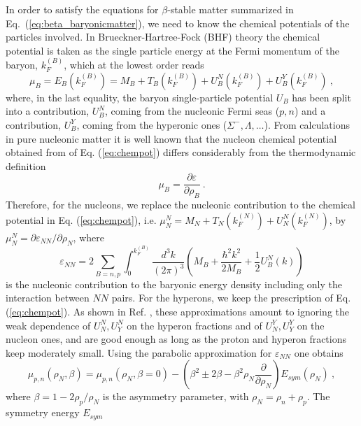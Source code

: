 In order to satisfy the equations 
for $\beta$-stable matter summarized in Eq.\ (\ref{eq:beta_baryonicmatter}), 
we need to know the chemical potentials of the particles involved.
In Brueckner-Hartree-Fock (BHF) theory the chemical potential is taken as
the
single particle energy at the Fermi momentum of the baryon, $k_F^{(B)}$,
which at the lowest order reads
\begin{equation}
\mu_B=E_B(k_F^{(B)})=M_B+T_B(k_F^{(B)})+U_B^N(k_F^{(B)})+
U_B^Y(k_F^{(B)}) \ ,
\label{eq:chempot}
\end{equation}
where, in the last equality, the baryon
single-particle potential $U_B$ has been split into a contribution,
$U_B^N$, coming from the nucleonic Fermi seas ($p, n$) and a contribution,
$U_B^Y$,
coming from the hyperonic ones ($\Sigma^-, \Lambda, \dots$).
From calculations in pure nucleonic matter it is well known
that the nucleon chemical potential obtained from of 
Eq. (\ref{eq:chempot}) differs considerably
from the thermodynamic definition
\begin{equation}
\mu_B= \frac{\partial \varepsilon}{\partial \rho_B}  \ .
\end{equation}
Therefore, for the nucleons, we replace the nucleonic contribution 
to the
chemical potential in Eq. (\ref{eq:chempot}), i.e. $\mu_N^N=
M_N+T_N(k_F^{(N)})+U_N^N(k_F^{(N)})$,
by $\mu_N^N=\partial \varepsilon_{NN}/\partial \rho_N$, 
where 
\begin{equation}
\varepsilon_{NN}=
2\sum_{B=n,p}
\int_0^{k_F^{(B)}} \frac{d^3 k}{(2\pi)^3}
\left(M_B + \frac{\hbar^2k^2}{2M_B}+\frac{1}{2}U_B^N(k) \right) 
\label{eq:nnepsilon}
\end{equation}
is the nucleonic contribution to the baryonic
energy density including only the interaction between $NN$ pairs.
For the hyperons, we keep the prescription of Eq. (\ref{eq:chempot}).
As shown in Ref. \cite{bbs00}, these approximations amount to ignoring
the weak dependence of $U_N^N, U_Y^N$ on the hyperon fractions and
of $U_N^Y, U_Y^Y$ on the nucleon ones, and are good enough as long
as the proton and hyperon fractions keep moderately small. 
Using the parabolic approximation for 
$\varepsilon_{NN}$
one obtains
\cite{bbs00}
\begin{equation}
\mu_{p,n}(\rho_N,\beta)=\mu_{p,n}(\rho_N,\beta=0)-\left(\beta^2 \pm 2\beta
-\beta^2\rho_N
\frac{\partial}{\partial \rho_N}\right)E_{sym}(\rho_N) \ ,
\end{equation}
where $\beta=1-2\rho_p/\rho_N$ is the asymmetry parameter, with
$\rho_N=\rho_n+\rho_p$. The symmetry energy
$E_{sym}$
